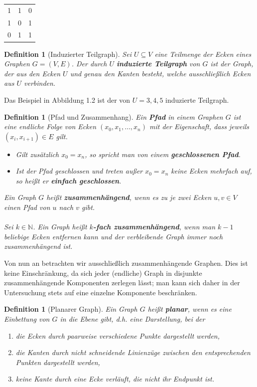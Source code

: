 \documentclass[11pt,a4paper,leqno]{report}
\newtheorem{definition}[theorem]{Definition}
\numberwithin{equation}{chapter}
\begin{document}
\begin{center}
	\begin{tabular}{c c c}
		1 & 1 & 0\\
		1 & 0 & 1\\
		0 & 1 & 1\\
	\end{tabular} 
\end{center}
\begin{definition}[Induzierter Teilgraph]
	Sei $U \subseteq V$ eine Teilmenge der Ecken eines Graphen $G=(V,E)$. Der durch $U$ \textbf{induzierte Teilgraph} von $G$ ist der Graph, der aus den Ecken $U$ und genau den Kanten besteht, welche ausschließlich Ecken aus $U$ verbinden.
\end{definition}
Das Beispiel in Abbildung 1.2 ist der von $U={3,4,5}$ induzierte Teilgraph.\\
\begin{definition}[Pfad und Zusammenhang]
	Ein \textbf{Pfad} in einem Graphen $G$ ist eine endliche Folge von Ecken $(x_0,x_1,\dots, x_n)$ mit der Eigenschaft, dass jeweils $(x_i,x_{i+1}) \in E$ gilt.
	\begin{itemize}
		\item Gilt zusätzlich $x_0 = x_n$, so spricht man von einem \textbf{geschlossenen Pfad}.
		\item Ist der Pfad geschlossen und treten außer $x_0 = x_n$ keine Ecken mehrfach auf, so heißt er \textbf{einfach geschlossen}.
	\end{itemize}
	Ein Graph $G$ heißt \textbf{zusammenhängend}, wenn es zu je zwei Ecken $u,v \in V$ einen Pfad von $u$ nach $v$ gibt.\\
	\\
	Sei  $k\in\mathbb{N}$. Ein Graph heißt \textbf{$k$-fach zusammen\-h\"angend}, wenn  man $k - 1$ beliebige Ecken entfernen kann und der verbleibende Graph immer noch zusammenh\"angend ist.
\end{definition}
\noindent
Von nun an betrachten wir ausschließlich zusammenhängende Graphen. Dies ist keine Einschränkung, da sich jeder (endliche) Graph in disjunkte zusammenhängende Komponenten zerlegen lässt; man kann sich daher in der Untersuchung stets auf eine einzelne Komponente beschränken.
\begin{definition}[Planarer Graph]
	Ein Graph $G$ heißt \textbf{planar}, wenn es eine Einbettung von $G$ in die Ebene gibt, d.h. eine Darstellung, bei der
	\begin{enumerate}
		\item die Ecken durch paarweise verschiedene Punkte dargestellt werden,
		\item die Kanten durch nicht schneidende Linienzüge zwischen den entsprechenden Punkten dargestellt werden,
		\item keine Kante durch eine Ecke verläuft, die nicht ihr Endpunkt ist.
	\end{enumerate}
\end{definition}
\end{document}
